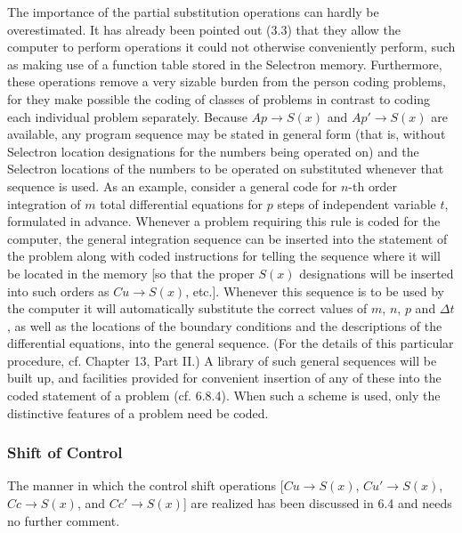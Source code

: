 \documentclass[12pt]{amsart}
\begin{document}
The importance of the partial substitution operations can hardly be overestimated. It has already been pointed out (3.3) that they allow the computer to perform operations it could not otherwise conveniently perform, such as making use of a function table stored in the Selectron memory. Furthermore, these operations remove a very sizable burden from the person coding problems, for they make possible the coding of classes of problems in contrast to coding each individual problem separately. Because $Ap \rightarrow S(x)$ and $Ap' \rightarrow S(x)$ are available, any program sequence may be stated in general form (that is, without Selectron location designations for the numbers being operated on) and the Selectron locations of the numbers to be operated on substituted whenever that sequence is used. As an example, consider a general code for $n$-th order integration of $m$ total differential equations for $p$ steps of independent variable $t$, formulated in advance. Whenever a problem requiring this rule is coded for the computer, the general integration sequence can be inserted into the statement of the problem along with coded instructions for telling the sequence where it will be located in the memory [so that the proper $S(x)$ designations will be inserted into such orders as $Cu \rightarrow S(x)$, etc.]. Whenever this sequence is to be used by the computer it will automatically substitute the correct values of $m$, $n$, $p$ and $\Delta t$, as well as the locations of the boundary conditions and the descriptions of the differential equations, into the general sequence. (For the details of this particular procedure, cf. Chapter 13, Part II.) A library of such general sequences will be built up, and facilities provided for convenient insertion of any of these into the coded statement of a problem (cf. 6.8.4). When such a scheme is used, only the distinctive features of a problem need be coded.

\subsubsection{Shift of Control}
The manner in which the control shift operations [$Cu \rightarrow S(x)$, $Cu' \rightarrow S(x)$, $Cc \rightarrow S(x)$, and $Cc' \rightarrow S(x)$] are realized has been discussed in 6.4 and needs no further comment.
\end{document}
